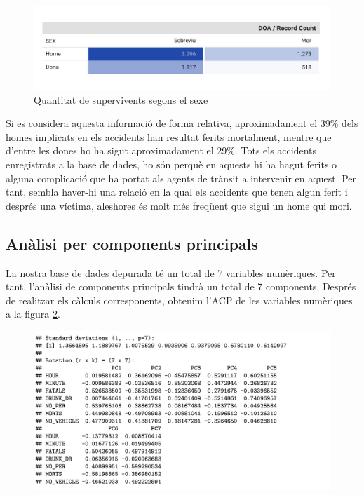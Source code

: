 \documentclass[12pt,longbibliography]{article}
\theoremstyle{definition}
\theoremstyle{remark}
\begin{document}
\begin{figure}[H]
\begin{center}
\includegraphics[width=15cm]{Table1}
\end{center}
\caption{Quantitat de supervivents segons el sexe}
\label{fig:G5}
\end{figure}


Si es considera aquesta informació de forma relativa, aproximadament el 39\% dels homes implicats en els accidents han resultat ferits mortalment, mentre que d'entre les dones ho ha sigut aproximadament el 29\%. Tots els accidents enregistrats a la base de dades, ho són perquè en aquests hi ha hagut ferits o alguna complicació que ha portat als agents de trànsit a intervenir en aquest. Per tant, sembla haver-hi una relació en la qual els accidents que tenen algun ferit i després una víctima, aleshores és molt més freqüent que sigui un home qui mori.


\subsection{Anàlisi per components principals}


La nostra base de dades depurada té un total de 7 variables numèriques. Per tant, l'anàlisi de components principals tindrà un total de 7 components. Després de realitzar els càlculs corresponents, obtenim l'ACP de les variables numèriques a la figura \ref{fig:ACP1}.

\begin{figure}[H]
\begin{center}
\includegraphics[width=14.5cm]{acp1}
\end{center}
\label{fig:ACP1}
\end{figure}
\end{document}
